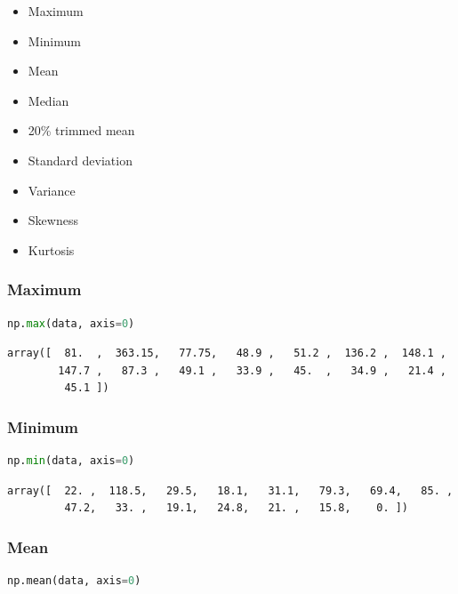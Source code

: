 \begin{itemize}
\tightlist
\item
  Maximum
\item
  Minimum
\item
  Mean
\item
  Median
\item
  20\% trimmed mean
\item
  Standard deviation
\item
  Variance
\item
  Skewness
\item
  Kurtosis
\end{itemize}

\hypertarget{maximum}{%
\subsubsection{Maximum}\label{maximum}}

\begin{lstlisting}[language=Python]
np.max(data, axis=0)
\end{lstlisting}

\begin{lstlisting}
array([  81.  ,  363.15,   77.75,   48.9 ,   51.2 ,  136.2 ,  148.1 ,
        147.7 ,   87.3 ,   49.1 ,   33.9 ,   45.  ,   34.9 ,   21.4 ,
         45.1 ])
\end{lstlisting}

\hypertarget{minimum}{%
\subsubsection{Minimum}\label{minimum}}

\begin{lstlisting}[language=Python]
np.min(data, axis=0)
\end{lstlisting}

\begin{lstlisting}
array([  22. ,  118.5,   29.5,   18.1,   31.1,   79.3,   69.4,   85. ,
         47.2,   33. ,   19.1,   24.8,   21. ,   15.8,    0. ])
\end{lstlisting}

\hypertarget{mean}{%
\subsubsection{Mean}\label{mean}}

\begin{lstlisting}[language=Python]
np.mean(data, axis=0)
\end{lstlisting}

